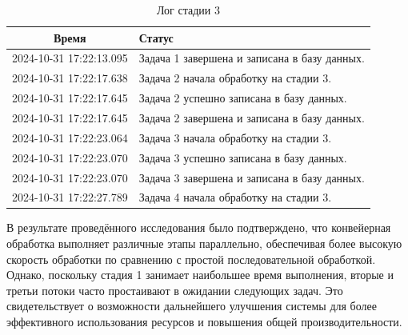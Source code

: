 \begin{table}[h!]
\begin{center}
\begin{threeparttable}
\caption{Лог стадии 3}
\captionsetup{justification=raggedright, singlelinecheck=false}
\label{4-tb}
\begin{tabular}{|c|p{10cm}|}
    \hline
    \textbf{Время} & \textbf{Статус} \\
    \hline
    2024-10-31 17:22:13.095 & Задача 1 завершена и записана в базу данных. \\
    2024-10-31 17:22:17.638 & Задача 2 начала обработку на стадии 3. \\
    2024-10-31 17:22:17.645 & Задача 2 успешно записана в базу данных. \\
    2024-10-31 17:22:17.645 & Задача 2 завершена и записана в базу данных. \\
    2024-10-31 17:22:23.064 & Задача 3 начала обработку на стадии 3. \\
    2024-10-31 17:22:23.070 & Задача 3 успешно записана в базу данных. \\
    2024-10-31 17:22:23.070 & Задача 3 завершена и записана в базу данных. \\
    2024-10-31 17:22:27.789 & Задача 4 начала обработку на стадии 3. \\
    \hline
\end{tabular}
\end{threeparttable}
\end{center}
\end{table}

\clearpage

В результате проведённого исследования было подтверждено, что конвейерная обработка выполняет различные этапы параллельно, обеспечивая более высокую скорость обработки по сравнению с простой последовательной обработкой. Однако, поскольку стадия 1 занимает наибольшее время выполнения, вторые и третьи потоки часто простаивают в ожидании следующих задач. Это свидетельствует о возможности дальнейшего улучшения системы для более эффективного использования ресурсов и повышения общей производительности.
